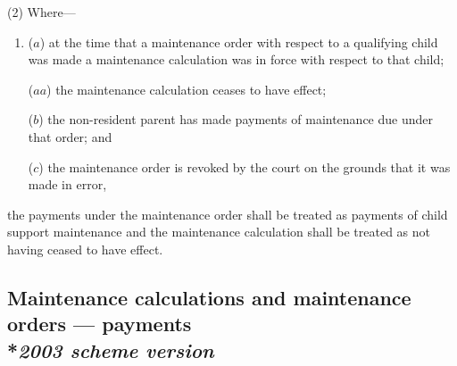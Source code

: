 \documentclass[12pt,a4paper]{article}
\begin{document}
(2) Where—
\begin{enumerate}\item[]
($a$) at the time that a maintenance order with respect to a qualifying child was made a maintenance 
calculation 
was in force with respect to that child;

($aa$) the maintenance 
calculation
ceases to have effect;

($b$) the 
non-resident parent 
has made payments of maintenance due under that order; and

($c$) the maintenance order is revoked by the court on the grounds that it was made in error,
\end{enumerate}
the payments under the maintenance order shall be treated as payments of child support maintenance and the maintenance 
calculation 
shall be treated 
as not having ceased to have effect. %


\subsection[8A. Maintenance calculations and maintenance orders --- payments --- \emph{2003 scheme version}]{\sloppy Maintenance calculations and maintenance orders --- payments\\*\emph{2003 scheme version}}
\end{document}

